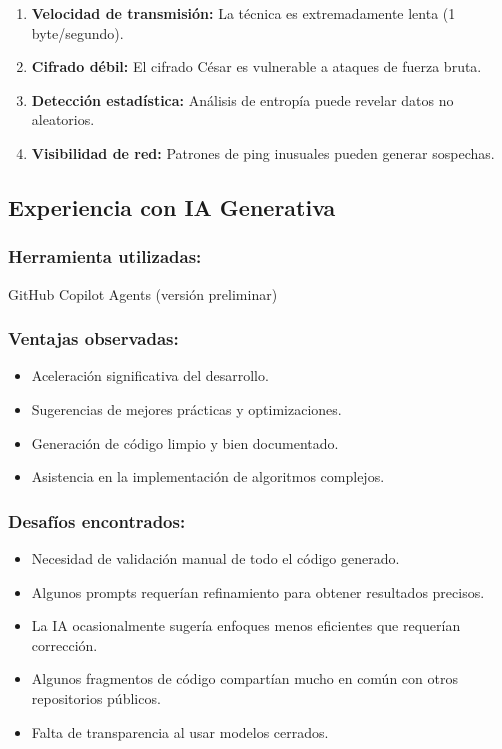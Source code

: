 \documentclass[letter,12pt]{article}
\begin{document}
\begin{enumerate}
    \item \textbf{Velocidad de transmisión:} La técnica es extremadamente lenta (1 byte/segundo).
    \item \textbf{Cifrado débil:} El cifrado César es vulnerable a ataques de fuerza bruta.
    \item \textbf{Detección estadística:} Análisis de entropía puede revelar datos no aleatorios.
    \item \textbf{Visibilidad de red:} Patrones de ping inusuales pueden generar sospechas.
\end{enumerate}

\subsection*{Experiencia con IA Generativa}

\subsubsection*{Herramienta utilizadas:} GitHub Copilot Agents (versión preliminar)

\subsubsection*{Ventajas observadas:}
\begin{itemize}
    \item Aceleración significativa del desarrollo.
    \item Sugerencias de mejores prácticas y optimizaciones.
    \item Generación de código limpio y bien documentado.
    \item Asistencia en la implementación de algoritmos complejos.
\end{itemize}

\subsubsection*{Desafíos encontrados:}
\begin{itemize}
    \item Necesidad de validación manual de todo el código generado.
    \item Algunos prompts requerían refinamiento para obtener resultados precisos.
    \item La IA ocasionalmente sugería enfoques menos eficientes que requerían corrección.
    \item Algunos fragmentos de código compartían mucho en común con otros repositorios públicos.
    \item Falta de transparencia al usar modelos cerrados.
\end{itemize}
\end{document}
